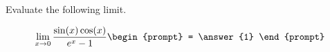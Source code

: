 \documentclass{ximera}
\author{Steven Gubkin}
\begin{document}
\begin{exercise}

Evaluate the following limit. %

\[
\lim_{x \to 0} \frac{\sin(x)\cos(x)}{e^x - 1} \begin{prompt} = \answer{1}
\end{prompt}
\]

\end{exercise}
\end{document}

